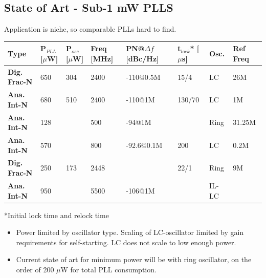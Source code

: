 \documentclass[10pt,a4paper]{article}
\begin{document}
		\subsection{State of Art - Sub-1 mW PLLS}
		\footnotesize Application is niche, so comparable PLLs hard to find.
		\vspace{-1em}
		\begin{table}[htb!]
			\tiny
			\centering
			\def\arraystretch{1.5}		
			\setlength\arrayrulewidth{0.75pt}
			\setlength{\tabcolsep}{1em} %
			\begin{tabular}{|l|l|l|l|l|l|l|l|}
				\hline 
				\rule[-1ex]{0pt}{2.5ex} \cellcolor{gray!40}\textbf{Type} & \cellcolor{gray!40}\textbf{P$_{PLL}$ [$\mu$W]}& \cellcolor{gray!40}\textbf{P$_{osc}$ [$\mu$W] }& \cellcolor{gray!40}\textbf{Freq [MHz]} & \cellcolor{gray!40}\textbf{PN@$\Delta f$ [dBc/Hz]}& \cellcolor{gray!40}\textbf{t$_{lock}$* [$\mu$s]}& \cellcolor{gray!40}\textbf{Osc. }& \cellcolor{gray!40}\textbf{Ref Freq}\\ 
				\hline 
				\rule[-1ex]{0pt}{2.5ex} \textbf{Dig. Frac-N} & 650 & 304 & 2400 & -110@0.5M & 15/4 & LC & 26M\\ 
				\hline 
				\rule[-1ex]{0pt}{2.5ex} \textbf{Ana. Int-N }& 680 & 510 & 2400 & -110@1M & 130/70 & LC & 1M\\ 
				\hline 
				\rule[-1ex]{0pt}{2.5ex} \textbf{Ana. Int-N} & 128 &  & 500 & -94@1M &  & Ring & 31.25M\\ 
				\hline 
				\rule[-1ex]{0pt}{2.5ex} \textbf{Ana. Int-N} & 570 &  & 800 & -92.6@0.1M & 200 & LC & 0.2M\\ 
				\hline 
				\rule[-1ex]{0pt}{2.5ex} \textbf{Dig. Frac-N} & 250 & 173 & 2448 &  & 22/1 & Ring & 9M\\ 
				\hline 
				\rule[-1ex]{0pt}{2.5ex} \textbf{Ana. Int-N} & 950 &  & 5500 & -106@1M &  & IL-LC & \\ 
				\hline 
			\end{tabular} 
		\end{table}  
		\tiny
		\vspace{-1em}
		*Initial lock time and relock time
		\begin{itemize}
			\scriptsize
			\item Power limited by oscillator type. Scaling of LC-oscillator limited by gain requirements for self-starting. LC does not scale to low enough power.
			\item Current state of art for minimum power will be with ring oscillator, on the order of 200 $\mu$W for total PLL consumption.
		\end{itemize}
\end{document}

